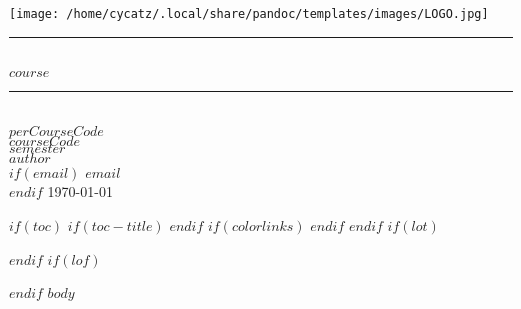 \documentclass[
$if(fontsize)$
  $fontsize$,
$endif$
$if(lang)$
  $babel-lang$,
$endif$
$if(papersize)$
  $papersize$paper,
$endif$
$if(handout)$
  handout,
$endif$
$if(aspectratio)$
  aspectratio=$aspectratio$,
$endif$
$for(classoption)$
  $classoption$$sep$,
$endfor$
]{$documentclass$}
\begin{document}
	\begin{titlepage}
		\centering
		\vspace*{0.1cm}
		\texttt{[image: /home/cycatz/.local/share/pandoc/templates/images/LOGO.jpg]}\\[0.2cm] 
		\rule{\linewidth}{0.2 mm} \\[0.4 cm]
		{\huge $course$}\\
		\rule{\linewidth}{0.3 mm} \\[1.5 cm]
		\textsc{\Large $perCourseCode$}\\[0.5 cm]				%
		\textsc{\large $courseCode$}\\[0.5 cm]				%
		\textsc{\large $semester$}\\[0.5 cm]				%
		\vspace*{\fill}
		\large{$author$}\\
		$if(email)$
		\large{$email$}\\
		$endif$
		\large{\today}
	\end{titlepage}
$if(toc)$
	$if(toc-title)$
		\renewcommand*\contentsname{$toc-title$}
	$endif$
	$if(colorlinks)$
		\hypersetup{linkcolor=$if(toccolor)$$toccolor$$else$$endif$}
	$endif$
	\setcounter{tocdepth}{$toc-depth$}
	\tableofcontents
$endif$
$if(lot)$
	\listoftables
$endif$
$if(lof)$
	\listoffigures
$endif$
$body$
\end{document}
